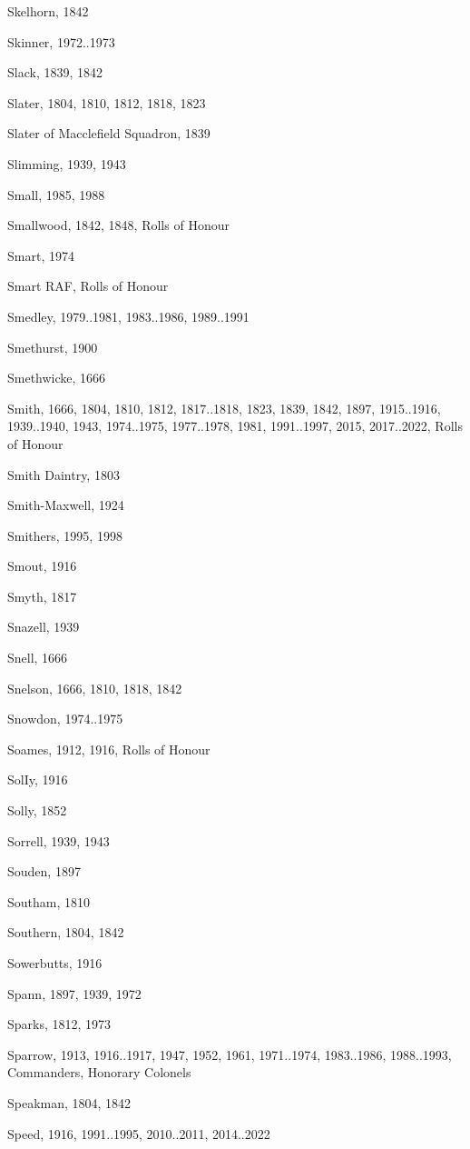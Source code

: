 \begin{theindex}
\item Skelhorn, 1842
\item Skinner, 1972..1973
\item Slack, 1839, 1842
\item Slater, 1804, 1810, 1812, 1818, 1823
\item Slater of Macclefield Squadron, 1839
\item Slimming, 1939, 1943
\item Small, 1985, 1988
\item Smallwood, 1842, 1848, Rolls of Honour
\item Smart, 1974
\item Smart RAF, Rolls of Honour
\item Smedley, 1979..1981, 1983..1986, 1989..1991
\item Smethurst, 1900
\item Smethwicke, 1666
\item Smith, 1666, 1804, 1810, 1812, 1817..1818, 1823, 1839, 1842, 1897, 1915..1916, 1939..1940, 1943, 1974..1975, 1977..1978, 1981, 1991..1997, 2015, 2017..2022, Rolls of Honour
\item Smith Daintry, 1803
\item Smith-Maxwell, 1924
\item Smithers, 1995, 1998
\item Smout, 1916
\item Smyth, 1817
\item Snazell, 1939
\item Snell, 1666
\item Snelson, 1666, 1810, 1818, 1842
\item Snowdon, 1974..1975
\item Soames, 1912, 1916, Rolls of Honour
\item SolIy, 1916
\item Solly, 1852
\item Sorrell, 1939, 1943
\item Souden, 1897
\item Southam, 1810
\item Southern, 1804, 1842
\item Sowerbutts, 1916
\item Spann, 1897, 1939, 1972
\item Sparks, 1812, 1973
\item Sparrow, 1913, 1916..1917, 1947, 1952, 1961, 1971..1974, 1983..1986, 1988..1993, Commanders, Honorary Colonels
\item Speakman, 1804, 1842
\item Speed, 1916, 1991..1995, 2010..2011, 2014..2022

\end{theindex}
